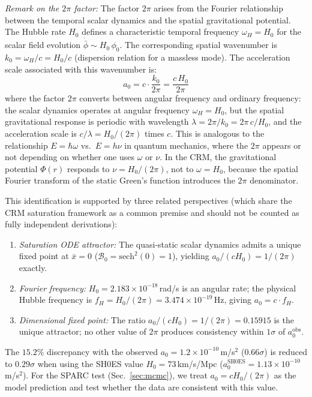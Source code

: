 \documentclass[aps,prd,twocolumn,superscriptaddress,nofootinbib]{revtex4-2}
\begin{document}
\textit{Remark on the $2\pi$ factor:} The factor $2\pi$ arises from the Fourier relationship between the temporal scalar dynamics and the spatial gravitational potential. The Hubble rate $H_0$ defines a characteristic temporal frequency $\omega_H = H_0$ for the scalar field evolution $\dot{\bar{\phi}} \sim H_0\,\phi_0$. The corresponding spatial wavenumber is $k_0 = \omega_H / c = H_0/c$ (dispersion relation for a massless mode). The acceleration scale associated with this wavenumber is:
\begin{equation}
a_0 = c \cdot \frac{k_0}{2\pi} = \frac{c\,H_0}{2\pi}
\end{equation}
where the factor $2\pi$ converts between angular frequency and ordinary frequency: the scalar dynamics operates at angular frequency $\omega_H = H_0$, but the spatial gravitational response is periodic with wavelength $\lambda = 2\pi/k_0 = 2\pi\,c/H_0$, and the acceleration scale is $c/\lambda = H_0/(2\pi)$ times $c$. This is analogous to the relationship $E = \hbar\omega$ vs.\ $E = h\nu$ in quantum mechanics, where the $2\pi$ appears or not depending on whether one uses $\omega$ or $\nu$. In the CRM, the gravitational potential $\Phi(r)$ responds to $\nu = H_0/(2\pi)$, not to $\omega = H_0$, because the spatial Fourier transform of the static Green's function introduces the $2\pi$ denominator.

This identification is supported by three related perspectives (which share the CRM saturation framework as a common premise and should not be counted as fully independent derivations):
\begin{enumerate}
\item \textit{Saturation ODE attractor:} The quasi-static scalar dynamics admits a unique fixed point at $\bar{x} = 0$ ($\mathcal{B}_0 = \mathrm{sech}^2(0) = 1$), yielding $a_0/(cH_0) = 1/(2\pi)$ exactly.
\item \textit{Fourier frequency:} $H_0 = 2.183 \times 10^{-18}$\,rad/s is an angular rate; the physical Hubble frequency is $f_H = H_0/(2\pi) = 3.474 \times 10^{-19}$\,Hz, giving $a_0 = c \cdot f_H$.
\item \textit{Dimensional fixed point:} The ratio $a_0/(cH_0) = 1/(2\pi) = 0.15915$ is the unique attractor; no other value of $2\pi$ produces consistency within $1\sigma$ of $a_0^{\mathrm{obs}}$.
\end{enumerate}
The $15.2\%$ discrepancy with the observed $a_0 = 1.2 \times 10^{-10}$\,m/s$^2$ ($0.66\sigma$) is reduced to $0.29\sigma$ when using the SH0ES value $H_0 = 73$\,km/s/Mpc ($a_0^{\mathrm{SH0ES}} = 1.13 \times 10^{-10}$\,m/s$^2$). For the SPARC test (Sec.~\ref{sec:mcmc}), we treat $a_0 = cH_0/(2\pi)$ as the model prediction and test whether the data are consistent with this value.
\end{document}
